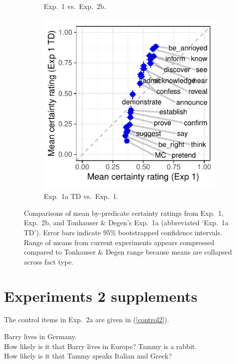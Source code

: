 \documentclass[11pt,fleqn]{article}
\newcommand{\6}{\mbox{$[\hspace*{-.6mm}[$}}
\newcommand{\9}{\mbox{$]\hspace*{-.6mm}]$}}
\begin{document}
\begin{figure}[h!]
\begin{subfigure}{.33\textwidth}
\caption{Exp.~1 vs.\ Exp.~2b.}
\label{f-projcomp2}
\end{subfigure}
\begin{subfigure}{.33\textwidth}
\includegraphics[width=\textwidth]{../../results/projection-comparisons/graphs/projection-comparison-59}
\caption{Exp.~1a TD vs.\  Exp.~1.}
\label{f-projcomp3}
\end{subfigure}
\caption{Comparisons of mean by-predicate certainty ratings from Exp.~1, Exp.~2b, and Tonhauser \& Degen's Exp.~1a (abbreviated `Exp.~1a TD'). Error bars indicate 95\% bootstrapped confidence intervals. Range of means from current experiments appears compressed compared to Tonhauser \& Degen range because means are collapsed across fact type.}
\label{f-projection-comparisons}
\end{figure}

\section{Experiments 2 supplements}\label{a-exp2}

The control items in Exp.~2a are given in (\ref{control2}).

\begin{exe}
\ex\label{control2}
\begin{xlist}
 Barry lives in Germany. \\ How likely is it that Barry lives in Europe?
 Tammy is a rabbit. \\ How likely is it that Tammy speaks Italian and Greek?
\end{xlist}
\end{exe}
\end{document}
